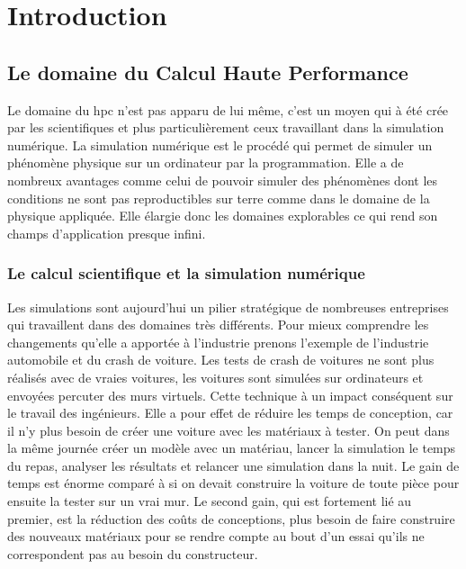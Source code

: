 \chapter{Introduction}
\label{chap:intro}
\minitoc


 \section{Le domaine du Calcul Haute Performance} 
 


Le domaine du \gls{hpc} n'est pas apparu de lui même, c'est un moyen qui à été crée par les scientifiques et plus particulièrement ceux travaillant dans la simulation numérique. La simulation numérique est le procédé qui permet de simuler un phénomène physique sur un ordinateur par la programmation. Elle a de nombreux avantages comme celui de pouvoir simuler des phénomènes dont les conditions ne sont pas reproductibles sur terre comme dans le  domaine de la physique appliquée. Elle élargie donc les domaines explorables ce qui rend son champs d'application presque infini.  


 \subsection{Le calcul scientifique et la simulation numérique}


Les simulations sont aujourd'hui un pilier stratégique de nombreuses entreprises qui travaillent dans des domaines très différents. Pour mieux comprendre les changements qu'elle a apportée à l'industrie prenons l'exemple de l'industrie automobile et du crash de voiture. Les tests de crash de voitures ne sont plus réalisés avec de vraies voitures, les voitures sont simulées sur ordinateurs et envoyées percuter des murs virtuels. Cette technique à un impact conséquent sur le travail des ingénieurs. Elle a pour effet de réduire les temps de conception, car il n'y plus besoin de créer une voiture avec les matériaux à tester. On peut dans la même journée créer un modèle avec un matériau, lancer la simulation le temps du repas, analyser les résultats et relancer une simulation dans la nuit. Le gain de temps est énorme comparé à si on devait construire la voiture de toute pièce pour ensuite la tester sur un vrai mur. Le second gain, qui est fortement lié au premier, est la réduction des coûts de conceptions, plus besoin de faire construire des nouveaux matériaux pour se rendre compte au bout d'un essai qu'ils ne correspondent pas au besoin du constructeur. 



